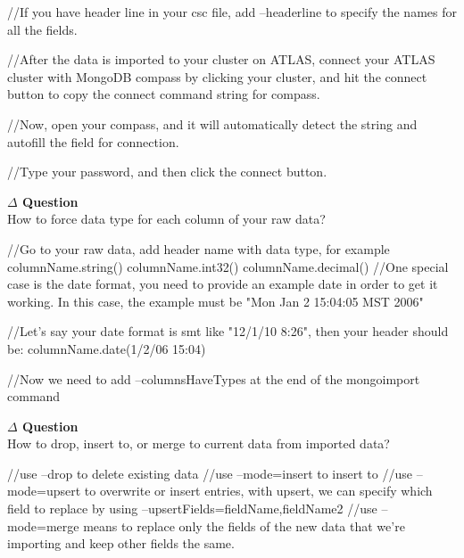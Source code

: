 \documentclass[12pt]{article}
\newenvironment{que}
    { \begin{mdframed}[backgroundcolor=green!20] \textbf{$\Delta$ Question} \\}
    {  \end{mdframed}}
\begin{document}
\begin{code}
\begin{code}
//If you have header line in your csc file, add --headerline to specify the names for all the fields.

//After the data is imported to your cluster on ATLAS, connect your ATLAS cluster with MongoDB compass by clicking your cluster, and hit the connect button to copy the connect command string for compass.

//Now, open your compass, and it will automatically detect the string and autofill the field for connection.

//Type your password, and then click the connect button.
\end{code}
\begin{que}
How to force data type for each column of your raw data?
\end{que}
\begin{code}
//Go to your raw data, add header name with data type, for example
columnName.string()
columnName.int32()
columnName.decimal()
//One special case is the date format, you need to provide an example date in order to get it working. In this case, the example must be "Mon Jan 2 15:04:05 MST 2006"

//Let's say your date format is smt like "12/1/10 8:26", then your header should be:
columnName.date(1/2/06 15:04)

//Now we need to add --columnsHaveTypes at the end of the mongoimport command
\end{code}

\begin{que}
How to drop, insert to, or merge to current data from imported data?
\end{que}
\begin{code}
//use --drop to delete existing data
//use --mode=insert to insert to
//use --mode=upsert to overwrite or insert entries, with upsert, we can specify which field to replace by using --upsertFields=fieldName,fieldName2
//use --mode=merge means to replace only the fields of the new data that we're importing and keep other fields the same.
\end{code}


\end{code}
\end{document}
